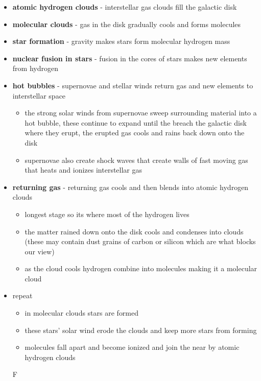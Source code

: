 \documentclass[12pt]{article}
\begin{document}
\begin{itemize}
    \item \textbf{atomic hydrogen clouds} - interstellar gas clouds fill the galactic disk
    \item \textbf{molecular clouds} - gas in the disk gradually cools and forms molecules
    \item \textbf{star formation} - gravity makes stars form molecular hydrogen mass
    \item \textbf{nuclear fusion in stars} - fusion in the cores of stars makes new elements from hydrogen
    \item \textbf{hot bubbles} - supernovae and stellar winds return gas and new elements to interstellar space
    \begin{itemize}
        \item the strong solar winds from supernovae sweep surrounding material into a hot bubble, these continue to expand until the breach the galactic disk where they erupt, the erupted gas cools and rains back down onto the disk
        \item supernovae also create shock waves that create walls of fast moving gas that heats and ionizes interstellar gas
    \end{itemize}
    \item \textbf{returning gas} - returning gas cools and then blends into atomic hydrogen clouds
    \begin{itemize}
        \item longest stage so its where most of the hydrogen lives
        \item the matter rained down onto the disk cools and condenses into clouds (these may contain dust grains of carbon or silicon which are what blocks our view)
        \item as the cloud cools hydrogen combine into molecules making it a molecular cloud
    \end{itemize}
    \item repeat
    \begin{itemize}
        \item in molecular clouds stars are formed
        \item these stars' solar wind erode the clouds and keep more stars from forming
        \item molecules fall apart and become ionized and join the near by atomic hydrogen clouds
    \end{itemize}F
\end{itemize}
\end{document}
